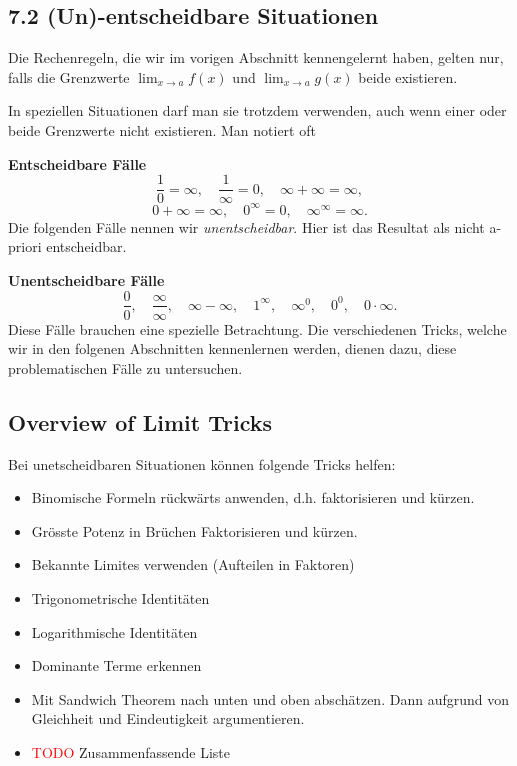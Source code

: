 \documentclass[a4paper,landscape,8pt]{extarticle}
\newcommand{\todo}{\textcolor{red}{TODO }}
\begin{document}
\begin{multicols*}{4}
\subsection{7.2 (Un)-entscheidbare Situationen}

Die Rechenregeln, die wir im vorigen Abschnitt kennengelernt haben, gelten nur,
falls die Grenzwerte $\lim_{x\to a} f(x)$ und $\lim_{x\to a} g(x)$ beide
existieren.

In speziellen Situationen darf man sie trotzdem verwenden, auch wenn einer oder
beide Grenzwerte nicht existieren. Man notiert oft

\textbf{Entscheidbare Fälle}
\[
\frac{1}{0} = \infty,
\quad
\frac{1}{\infty} = 0,
\quad
\infty + \infty = \infty,
\]
\[
0 + \infty = \infty,
\quad
0^\infty = 0,
\quad
\infty^\infty = \infty.
\]
Die folgenden Fälle nennen wir \emph{unentscheidbar}. Hier ist das Resultat als
nicht a-priori entscheidbar.

\textbf{Unentscheidbare Fälle}
\[
\frac{0}{0}, \quad \frac{\infty}{\infty}, \quad \infty-\infty, \quad
1^{\infty}, \quad \infty^{0}, \quad 0^0, \quad 0\cdot\infty.
\]
Diese Fälle brauchen eine spezielle Betrachtung. Die verschiedenen Tricks,
welche wir in den folgenen Abschnitten kennenlernen werden, dienen dazu, diese
problematischen Fälle zu untersuchen.

\begin{warmup}
\subsection{Overview of Limit Tricks}

Bei unetscheidbaren Situationen können folgende Tricks helfen:

\begin{itemize}
  \item Binomische Formeln rückwärts anwenden, d.h. faktorisieren und kürzen.
  \item Grösste Potenz in Brüchen Faktorisieren und kürzen.
  \item Bekannte Limites verwenden (Aufteilen in Faktoren)
  \item Trigonometrische Identitäten
  \item Logarithmische Identitäten
  \item Dominante Terme erkennen
  \item Mit Sandwich Theorem nach unten und oben abschätzen. Dann aufgrund von
  Gleichheit und Eindeutigkeit argumentieren.
  \item \todo Zusammenfassende Liste
\end{itemize}
\end{warmup}


\end{multicols*}
\end{document}
